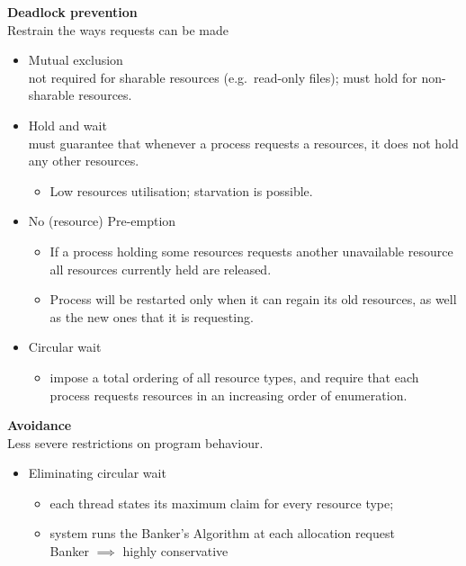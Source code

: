 \documentclass[11pt,a4paper]{article}
\begin{document}
\textbf{Deadlock prevention} \\
Restrain the ways requests can be made
\begin{itemize}
    \item Mutual exclusion \\
        not required for sharable resources (e.g.\ read-only files);
        must hold for non-sharable resources.
    \item Hold and wait \\
        must guarantee that whenever a process requests a resources,
        it does not hold any other resources.
        \begin{itemize}
            \item Low resources utilisation; starvation is possible.
        \end{itemize}
    \item No (resource) Pre-emption
        \begin{itemize}
            \item If a process holding some resources requests another unavailable resource
                all resources currently held are released.
            \item Process will be restarted only when it can regain its old resources,
                as well as the new ones that it is requesting.
        \end{itemize}
    \item Circular wait
        \begin{itemize}
            \item impose a total ordering of all resource types, and require that each process
                requests resources in an increasing order of enumeration.
        \end{itemize}
\end{itemize}

\textbf{Avoidance} \\
Less severe restrictions on program behaviour.
\begin{itemize}
    \item Eliminating circular wait
        \begin{itemize}
            \item each thread states its maximum claim for every resource type;
            \item system runs the Banker's Algorithm at each allocation request \\
                Banker $\implies$ highly conservative
        \end{itemize}
\end{itemize}
\end{document}
